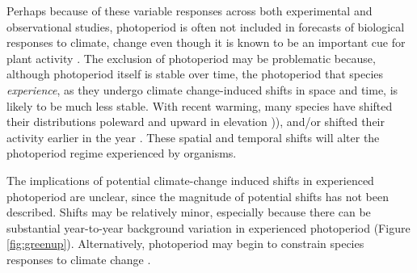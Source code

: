 \documentclass{article}
\begin{document}
\par Perhaps because of these variable responses across both experimental and observational studies, photoperiod is often not included in forecasts of biological responses to climate, change even though it is known to be an important cue for plant activity \citet[but see ][]{duputie2015}. %
The exclusion of photoperiod may be problematic because, although photoperiod itself is stable over time, the photoperiod that species \emph{experience}, as they undergo climate change-induced shifts in space and time, is likely to be much less stable. With recent warming, many species have shifted their distributions poleward and upward in elevation \citep[i.e., range shifts][]{parmesan2006,chen2011,harsch2009})), and/or shifted their activity earlier in the year \citep[i.e., phenological shifts][]{parmesan2006, wolkovich2012}. These spatial and temporal shifts will alter the photoperiod regime experienced by organisms. \par The implications of potential climate-change induced shifts in experienced photoperiod are unclear, since the magnitude of potential shifts has not been described. Shifts may be relatively minor, especially because there can be substantial year-to-year background variation in experienced photoperiod (Figure \ref{fig:greenup}). Alternatively, photoperiod may begin to constrain species responses to climate change \citep{koerner2010b}.

\end{document}
